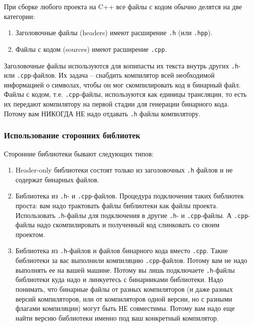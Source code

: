 При сборке любого проекта на C++ все файлы с кодом обычно делятся на две категории:
\begin{enumerate}
\item Заголовочные файлы (headers) имеют расширение \verb".h" (или \verb".hpp").

\item Файлы с кодом (sources) имеют расширение \verb".cpp".
\end{enumerate}
Заголовочные файлы используются для копипасты их текста внутрь других \verb".h"- или \verb".cpp"-файлов.
Их задача -- снабдить компилятор всей необходимой информацией о символах, чтобы он мог скомпилировать код в бинарный файл.
Файлы с кодом, т.е. \verb".cpp"-файлы, используются как единицы трансляции, то есть их передают компилятору на первой стадии для генерации бинарного кода.
Потому вам НИКОГДА НЕ надо отдавать \verb".h" файлы компилятору.

\subsubsection{Использование сторонних библиотек}

Сторонние библиотеки бывают следующих типов:
\begin{enumerate}
\item Header-only библиотеки состоят только из заголовочных \verb".h" файлов и не содержат бинарных файлов.

\item Библиотека из \verb".h"- и \verb".cpp"-файлов.
Процедура подключения таких библиотек проста: вам надо трактовать файлы библиотеки как файлы проекта.
Использовать \verb".h"-файлы для подключения в другие \verb".h"- и \verb".cpp"-файлы.
А \verb".cpp"-файлы надо скомпилировать и полученный код слинковать со своим проектом.

\item Библиотека из \verb".h"-файлов и файлов бинарного кода вместо \verb".cpp".
Такие библиотеки за вас выполнили компиляцию \verb".cpp"-файлов.
Потому вам не надо выполнять ее на вашей машине.
Потому вы лишь подключаете \verb".h"-файлы библиотеки куда надо и линкуетесь с бинарниками библиотеки.
Надо понимать, что бинарные файлы от разных компиляторов (и даже разных версий компиляторов, или от компиляторов одной версии, но с разными флагами компиляции) могут быть НЕ совместимы.
Потому вам надо еще найти версию библиотеки именно под ваш конкретный компилятор.
\end{enumerate}

